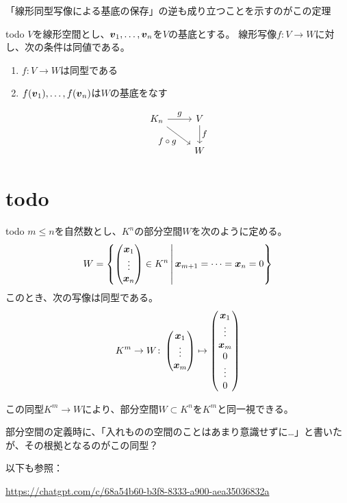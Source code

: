 \documentclass[../../../topic_linear-algebra]{subfiles}
\begin{document}
\begin{mindflow}
  「線形同型写像による基底の保存」の逆も成り立つことを示すのがこの定理
\end{mindflow}

\begin{theorem}{todo}
  $V$を線形空間とし、$\vb*{v}_1, \ldots, \vb*{v}_n$を$V$の基底とする。
  線形写像$f \colon V \to W$に対し、次の条件は同値である。
  \begin{enumerate}[label=\romanlabel]
    \item $f\colon V \to W$は同型である
    \item $f(\vb*{v}_1), \ldots, f(\vb*{v}_n)$は$W$の基底をなす
  \end{enumerate}
\end{theorem}

\begin{equation*}
  \begin{tikzcd}[every label/.append style = {font = \small}]
    K_n \arrow[r,"g"]\arrow[rd, "f \circ g"'] & V \arrow[d,"f"]\\
    & W
  \end{tikzcd}
\end{equation*}

\sectionline
\section{todo}

\begin{theorem}{todo}
  $m \leq n$を自然数とし、$K^n$の部分空間$W$を次のように定める。
  \begin{equation*}
    W = \left\{ \begin{pmatrix}
      \vb*{x}_1 \\ \vdots \\ \vb*{x}_n
    \end{pmatrix} \in K^n \,\middle|\,
    \begin{gathered} 
      \vb*{x}_{m+1} = \cdots = \vb*{x}_n = 0
    \end{gathered}
    \right\}
  \end{equation*}
  このとき、次の写像は同型である。
  \begin{equation*}
    K^m \to W \colon \begin{pmatrix}
      \vb*{x}_1 \\ \vdots \\ \vb*{x}_m
    \end{pmatrix} \mapsto \begin{pmatrix}
      \vb*{x}_1 \\ \vdots \\ \vb*{x}_m \\ 0 \\ \vdots \\ 0
    \end{pmatrix}
  \end{equation*}
\end{theorem}

この同型$K^m \to W$により、部分空間$W \subset K^n$を$K^m$と同一視できる。

\begin{mindflow}
  部分空間の定義時に、「入れものの空間のことはあまり意識せずに…」と書いたが、その根拠となるのがこの同型？
  
  以下も参照：
  
  \url{https://chatgpt.com/c/68a54b60-b3f8-8333-a900-aea35036832a}
\end{mindflow}
\end{document}
